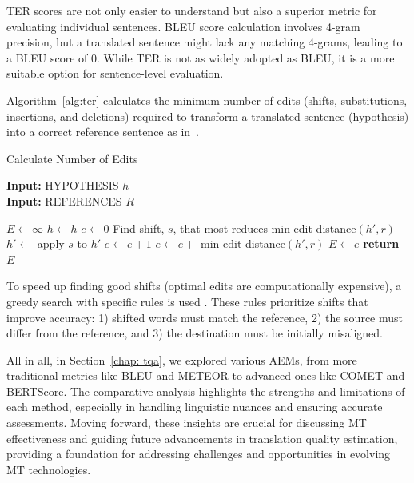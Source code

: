 {{TER scores are not only easier to understand but also a superior metric for evaluating individual sentences. BLEU score calculation involves 4-gram precision, but a translated sentence might lack any matching 4-grams, leading to a BLEU score of 0. While TER is not as widely adopted as BLEU, it is a more suitable option for sentence-level evaluation.

Algorithm~\ref{alg:ter} calculates the minimum number of edits (shifts, substitutions, insertions, and deletions) required to transform a translated sentence (hypothesis) into a correct reference sentence as in~\textcite{snover-etal-2006-study}.

\bigskip 

\begin{algorithm}
\small
\caption{Calculate Number of Edits}\label{alg:ter}
\hspace*{\algorithmicindent} \textbf{Input:} HYPOTHESIS $h$ \\ 
\hspace*{\algorithmicindent} \textbf{Input:} REFERENCES $R$
\begin{algorithmic}
\State $E\gets∞$ 
\State $h\gets h$ 
\State $e\gets0$ 
\Repeat
\State Find shift, $s$, that most reduces min-edit-distance$(h′, r)$
\State $h′\gets$ apply $s$ to $h′$ 
\State $e\gets e+1$
\EndIf
{}
\State $e\gets e+$ min-edit-distance$(h′, r)$
\State $E\gets e$
\EndIf
\EndFor
\State \textbf{return} $E$
\end{algorithmic}
\end{algorithm}

\bigskip 

To speed up finding good shifts (optimal edits are computationally expensive), a greedy search with specific rules is used \parencite{snover-etal-2006-study}. These rules prioritize shifts that improve accuracy: 1) shifted words must match the reference, 2) the source must differ from the reference, and 3) the destination must be initially misaligned.

\vspace{0.5em} %

All in all, in Section~\ref{chap: tqa}, we explored various AEMs, from more traditional metrics like BLEU and METEOR to advanced ones like COMET and BERTScore. The comparative analysis highlights the strengths and limitations of each method, especially in handling linguistic nuances and ensuring accurate assessments. Moving forward, these insights are crucial for discussing MT effectiveness and guiding future advancements in translation quality estimation, providing a foundation for addressing challenges and opportunities in evolving MT technologies.
}
}